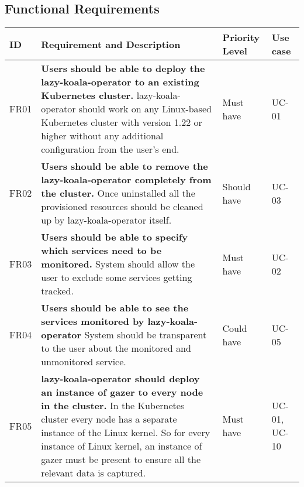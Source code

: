 
\newcommand{\functionalRequirement}[5]{
    #1 &
    \textbf{#2} \newline #3 &
    #4 &
    #5  \\ \hline
}

\subsection{Functional Requirements}

\begin{longtable}{|p{9mm}|p{109mm}|p{14mm}|p{13mm}|}
\hline
    \textbf{ID} &
    \textbf{Requirement and Description} &
    \textbf{Priority Level} &
    \textbf{Use case} \\ \hline


    \functionalRequirement
    {FR01}
    {Users should be able to deploy the \ac{lazy-koala-operator} to an existing Kubernetes cluster.}
    {\ac{lazy-koala-operator} should work on any Linux-based Kubernetes cluster with version 1.22 or higher without any additional configuration from the user's end.}
    {Must have}
    {UC-01}
    
    \functionalRequirement
    {FR02}
    {Users should be able to remove the \ac{lazy-koala-operator} completely from the cluster.}
    {Once uninstalled all the provisioned resources should be cleaned up by \ac{lazy-koala-operator} itself. }
    {Should have}
    {UC-03}
    
        
    \functionalRequirement
    {FR03}
    {Users should be able to specify which services need to be monitored.}
    {System should allow the user to exclude some services getting tracked.}
    {Must have}
    {UC-02}
    
        
    \functionalRequirement
    {FR04}
    {Users should be able to see the services monitored by \ac{lazy-koala-operator}}
    {System should be transparent to the user about the monitored and unmonitored service.}
    {Could have}
    {UC-05}
    
        
    \functionalRequirement
    {FR05}
    {\ac{lazy-koala-operator} should deploy an instance of \ac{gazer} to every node in the cluster.}
    {In the Kubernetes cluster every node has a separate instance of the Linux kernel. So for every instance of Linux kernel, an instance of \ac{gazer} must be present to ensure all the relevant data is captured.}
    {Must have}
    {UC-01, UC-10}
    

\end{longtable}
